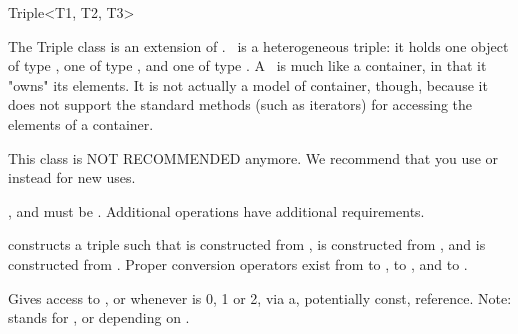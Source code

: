 \begin{ccRefClass}{Triple<T1, T2, T3>}
  
  \ccDefinition The Triple class is an extension of .
  \ccRefName\ is a heterogeneous triple: it holds one object of type
  , one of type , and one of type .  A
  \ccRefName\ is much like a container, in that it "owns" its
  elements. It is not actually a model of container, though, because
  it does not support the standard methods (such as iterators) for
  accessing the elements of a container.

  This class is NOT RECOMMENDED anymore.  We recommend that you use
   or  instead for new uses.

  
  \ccRequirements {},  and  must be .
  Additional operations have additional requirements.


  \ccTypes
  \ccGlue
  \ccGlue

  \ccGlue
  \ccGlue

  \ccCreation
  
  
  
   {constructs a triple such that  is constructed
    from ,  is constructed from , and
     is constructed from . \ccRequire Proper
    conversion operators exist from  to ,  to
    , and  to .}

    {Gives access to ,  or  whenever
      is 0, 1 or 2, via a, potentially const, reference.
     Note:  stands for ,  or  depending
     on .}


\end{ccRefClass}
